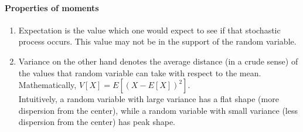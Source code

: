 \documentclass[12pt]{report} %
\begin{document}
	\paragraph*{Properties of moments}
	\begin{enumerate}
	\item Expectation is the value which one would expect to see if that stochastic process occurs. This value may not be in the support of the random variable.
	\item Variance on the other hand denotes the average distance (in a crude sense) of the values that random variable can take with respect to the mean. Mathematically, $V[X] = E[(X- E[X])^2]$.\\
	Intuitively, a random variable with large variance has a flat shape (more dispersion from the center), while a random variable with small variance (less dispersion from the center) has peak shape.   
	\end{enumerate}
\end{document}
